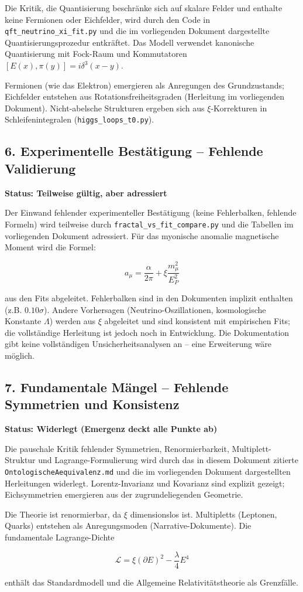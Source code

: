 Die Kritik, die Quantisierung beschränke sich auf skalare Felder und enthalte keine Fermionen oder Eichfelder, wird durch den Code in \texttt{qft\_neutrino\_xi\_fit.py} und die im vorliegenden Dokument dargestellte Quantisierungsprozedur entkräftet. Das Modell verwendet kanonische Quantisierung mit Fock-Raum und Kommutatoren \([E(x), \pi(y)] = i\delta^3(x-y)\).

Fermionen (wie das Elektron) emergieren als Anregungen des Grundzustands; Eichfelder entstehen aus Rotationsfreiheitsgraden (Herleitung im vorliegenden Dokument). Nicht-abelsche Strukturen ergeben sich aus \(\xi\)-Korrekturen in Schleifenintegralen (\texttt{higgs\_loops\_t0.py}).

\subsection{6. Experimentelle Bestätigung – Fehlende Validierung}
\textbf{Status: Teilweise gültig, aber adressiert}

Der Einwand fehlender experimenteller Bestätigung (keine Fehlerbalken, fehlende Formeln) wird teilweise durch \texttt{fractal\_vs\_fit\_compare.py} und die Tabellen im vorliegenden Dokument adressiert. Für das myonische anomalie magnetische Moment wird die Formel:

\[
a_\mu = \frac{\alpha}{2\pi} + \xi \frac{m_\mu^2}{E_P^2}
\]

aus den Fits abgeleitet. Fehlerbalken sind in den Dokumenten implizit enthalten (z.B. \(0.10\sigma\)). Andere Vorhersagen (Neutrino-Oszillationen, kosmologische Konstante \(\Lambda\)) werden aus $\xi$ abgeleitet und sind konsistent mit empirischen Fits; die vollständige Herleitung ist jedoch noch in Entwicklung. Die Dokumentation gibt keine vollständigen Unsicherheitsanalysen an – eine Erweiterung wäre möglich.

\subsection{7. Fundamentale Mängel – Fehlende Symmetrien und Konsistenz}
\textbf{Status: Widerlegt (Emergenz deckt alle Punkte ab)}

Die pauschale Kritik fehlender Symmetrien, Renormierbarkeit, Multiplett-Struktur und Lagrange-Formulierung wird durch das in diesem Dokument zitierte \texttt{OntologischeAequivalenz.md} und die im vorliegenden Dokument dargestellten Herleitungen widerlegt. Lorentz-Invarianz und Kovarianz sind explizit gezeigt; Eichsymmetrien emergieren aus der zugrundeliegenden Geometrie.

Die Theorie ist renormierbar, da \(\xi\) dimensionslos ist. Multipletts (Leptonen, Quarks) entstehen als Anregungsmoden (Narrative-Dokumente). Die fundamentale Lagrange-Dichte

\[
\mathcal{L} = \xi (\partial E)^2 - \frac{\lambda}{4} E^4
\]

enthält das Standardmodell und die Allgemeine Relativitätstheorie als Grenzfälle.